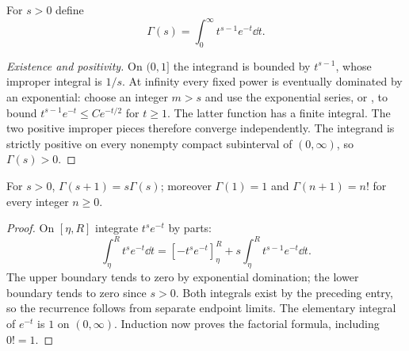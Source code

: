 \begin{definition}
For $s>0$ define
\[
 \Gamma(s)=\int_0^\infty t^{s-1}e^{-t}\dd t.
\]
\end{definition}
\begin{proof}[Existence and positivity]
On $(0,1]$ the integrand is bounded by $t^{s-1}$, whose improper integral is
$1/s$. At infinity every fixed power is eventually dominated by an exponential:
choose an integer $m>s$ and use the exponential series, or
, to bound $t^{s-1}e^{-t}\leq C e^{-t/2}$ for
$t\geq1$. The latter function has a finite integral. The two positive improper
pieces therefore converge independently. The integrand is strictly positive on
every nonempty compact subinterval of $(0,\infty)$, so $\Gamma(s)>0$.
\end{proof}

\begin{theorem}
For $s>0$, $\Gamma(s+1)=s\Gamma(s)$; moreover $\Gamma(1)=1$ and
$\Gamma(n+1)=n!$ for every integer $n\geq0$.
\end{theorem}
\begin{proof}
On $[\eta,R]$ integrate $t^se^{-t}$ by parts:
\[
 \int_\eta^R t^se^{-t}\dd t
 =[-t^se^{-t}]_\eta^R+s\int_\eta^R t^{s-1}e^{-t}\dd t.
\]
The upper boundary tends to zero by exponential domination; the lower boundary
tends to zero since $s>0$. Both integrals exist by the preceding entry, so the
recurrence follows from separate endpoint limits. The elementary integral of
$e^{-t}$ is $1$ on $(0,\infty)$. Induction now proves the factorial formula,
including $0!=1$.
\end{proof}

